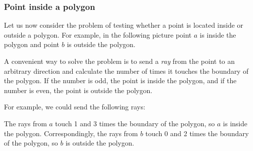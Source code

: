 \subsubsection{Point inside a polygon}

Let us now consider the problem of
testing whether a point is located inside or outside
a polygon.
For example, in the following picture point $a$
is inside the polygon and point $b$ is outside
the polygon.

\begin{center}
\end{center}

A convenient way to solve the problem is to
send a \emph{ray} from the point to an arbitrary direction
and calculate the number of times it touches
the boundary of the polygon.
If the number is odd,
the point is inside the polygon,
and if the number is even,
the point is outside the polygon.

\begin{samepage}
For example, we could send the following rays:
\begin{center}
\end{center}
\end{samepage}

The rays from $a$ touch 1 and 3 times
the boundary of the polygon,
so $a$ is inside the polygon.
Correspondingly, the rays from $b$
touch 0 and 2 times the boundary of the polygon,
so $b$ is outside the polygon.

